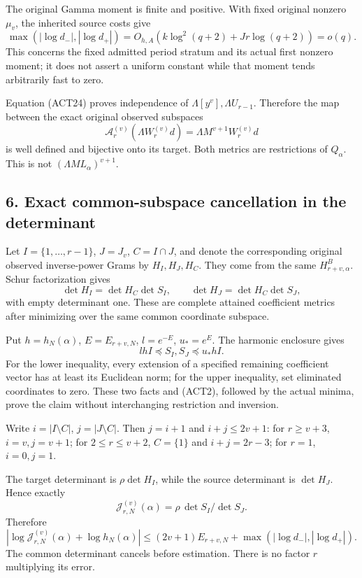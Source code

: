 \documentclass[11pt]{article}
\begin{document}
The original Gamma moment is finite and positive. With fixed original nonzero \(\mu_v\), the inherited source costs give \[
\max(|\log d_-|,|\log d_+|)
=O_{h,A}(k\log^2(q+2)+Jr\log(q+2))=o(q).
\tag{ACT26}
\] This concerns the fixed admitted period stratum and its actual first nonzero moment; it does not assert a uniform constant while that moment tends arbitrarily fast to zero.

Equation (ACT24) proves independence of \(\Lambda[y^v],\Lambda U_{r-1}\). Therefore the map between the exact original observed subspaces \[
\mathscr A_r^{(v)}(\Lambda W_r^{(v)}d)
=\Lambda M^{v+1}W_r^{(v)}d
\tag{ACT27}
\] is well defined and bijective onto its target. Both metrics are restrictions of \(Q_\alpha\). This is not \((\Lambda ML_\alpha)^{v+1}\).

\subsection{6. Exact common-subspace cancellation in the determinant}\label{exact-common-subspace-cancellation-in-the-determinant}

Let \(I=\{1,\ldots,r-1\}\), \(J=J_v\), \(C=I\cap J\), and denote the corresponding original observed inverse-power Grams by \(H_I,H_J,H_C\). They come from the same \(H^B_{r+v,\alpha}\). Schur factorization gives \[
\det H_I=\det H_C\det S_I,\qquad
\det H_J=\det H_C\det S_J,
\] with empty determinant one. These are complete attained coefficient metrics after minimizing over the same common coordinate subspace.

Put \(h=h_N(\alpha)\), \(E=E_{r+v,N}\), \(l=e^{-E}\), \(u_*=e^E\). The harmonic enclosure gives \[
lhI\preceq S_I,S_J\preceq u_*hI.
\tag{ACT28}
\] For the lower inequality, every extension of a specified remaining coefficient vector has at least its Euclidean norm; for the upper inequality, set eliminated coordinates to zero. These two facts and (ACT2), followed by the actual minima, prove the claim without interchanging restriction and inversion.

Write \(i=|I\setminus C|\), \(j=|J\setminus C|\). Then \(j=i+1\) and \(i+j\le2v+1\): for \(r\ge v+3\), \(i=v,j=v+1\); for \(2\le r\le v+2\), \(C=\{1\}\) and \(i+j=2r-3\); for \(r=1\), \(i=0,j=1\).

The target determinant is \(\rho\det H_I\), while the source determinant is \(\det H_J\). Hence exactly \[
\mathscr J_{r,N}^{(v)}(\alpha)=\rho\,\det S_I/\det S_J.
\] Therefore \[
\boxed{|\log\mathscr J_{r,N}^{(v)}(\alpha)+\log h_N(\alpha)|
\le(2v+1)E_{r+v,N}+\max(|\log d_-|,|\log d_+|).}
\tag{ACT29}
\] The common determinant cancels before estimation. There is no factor \(r\) multiplying its error.
\end{document}
